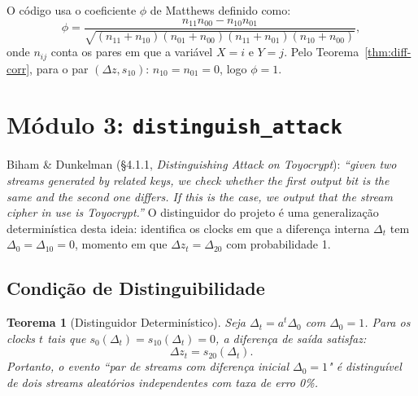 \documentclass[12pt,a4paper]{article}
\newtheorem{theorem}{Teorema}[section]
\theoremstyle{definition}
\theoremstyle{remark}
\newcommand{\ks}{z}
\begin{document}
O código usa o coeficiente $\phi$ de Matthews definido como:
\[
  \phi = \frac{n_{11}n_{00} - n_{10}n_{01}}
         {\sqrt{(n_{11}+n_{10})(n_{01}+n_{00})(n_{11}+n_{01})(n_{10}+n_{00})}},
\]
onde $n_{ij}$ conta os pares em que a variável $X=i$ e $Y=j$.
Pelo Teorema~\ref{thm:diff-corr}, para o par $(\Delta\ks, s_{10})$:
$n_{10} = n_{01} = 0$, logo $\phi = 1$.

\section{Módulo 3: \texttt{distinguish\_attack}}
\label{sec:distinguish}

\begin{paperref}
  Biham \& Dunkelman (\S4.1.1, \textit{Distinguishing Attack on Toyocrypt}):
  \textit{``given two streams generated by related keys, we check whether the
  first output bit is the same and the second one differs. If this is the
  case, we output that the stream cipher in use is Toyocrypt.''}
  O distinguidor do projeto é uma generalização determinística desta ideia:
  identifica os clocks em que a diferença interna $\Delta_t$ tem $\Delta_0 =
  \Delta_{10} = 0$, momento em que $\Delta\ks_t = \Delta_{20}$ com
  probabilidade 1.
\end{paperref}

\subsection{Condição de Distinguibilidade}

\begin{theorem}[Distinguidor Determinístico]
  \label{thm:distinguisher}
  Seja $\Delta_t = a^t \Delta_0$ com $\Delta_0 = 1$. Para os clocks $t$ tais
  que $s_0(\Delta_t) = s_{10}(\Delta_t) = 0$, a diferença de saída satisfaz:
  \[
    \Delta\ks_t = s_{20}(\Delta_t).
  \]
  Portanto, o evento \emph{``par de streams com diferença inicial $\Delta_0=1$"} é
  distinguível de dois streams aleatórios independentes com taxa de erro 0\%.
\end{theorem}
\end{document}
